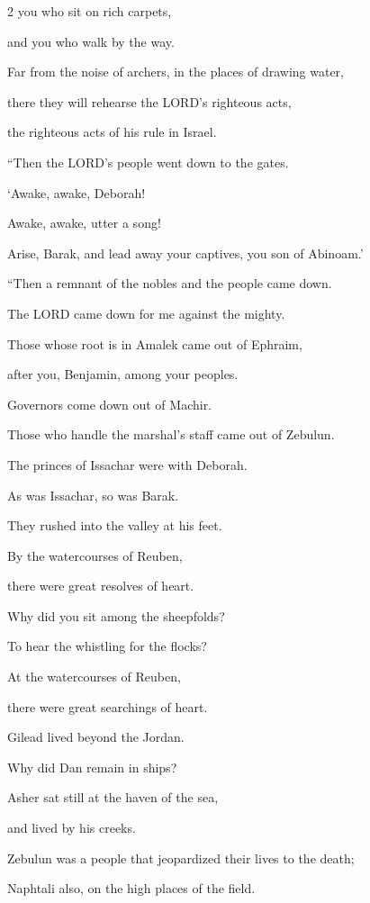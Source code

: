 \begin{multicols}{2}
you who sit on rich carpets,

and you who walk by the way.

\myverse{}Far from the noise of archers, in the places of drawing water,

there they will rehearse the LORD’s righteous acts,

the righteous acts of his rule in Israel.

\vspace{\baselineskip} 
“Then the LORD’s people went down to the gates.

\myverse{}‘Awake, awake, Deborah!

Awake, awake, utter a song!

Arise, Barak, and lead away your captives, you son of Abinoam.’


\vspace{\baselineskip} \myverse{}“Then a remnant of the nobles and the people came down.

The LORD came down for me against the mighty.

\myverse{}Those whose root is in Amalek came out of Ephraim,

after you, Benjamin, among your peoples.

Governors come down out of Machir.

Those who handle the marshal’s staff came out of Zebulun.

\myverse{}The princes of Issachar were with Deborah.

As was Issachar, so was Barak.

They rushed into the valley at his feet.

By the watercourses of Reuben,

there were great resolves of heart.

\myverse{}Why did you sit among the sheepfolds?

To hear the whistling for the flocks?

At the watercourses of Reuben,

there were great searchings of heart.

\myverse{}Gilead lived beyond the Jordan.

Why did Dan remain in ships?

Asher sat still at the haven of the sea,

and lived by his creeks.

\myverse{}Zebulun was a people that jeopardized their lives to the death;

Naphtali also, on the high places of the field.



\end{multicols}
